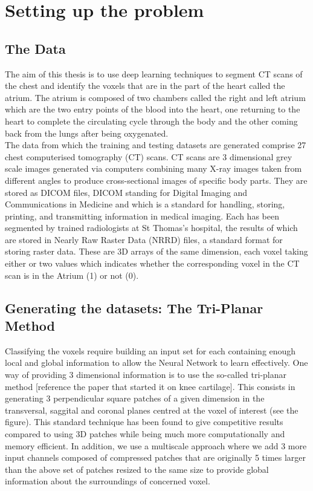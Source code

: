 \chapter{Setting up the problem}

\section{The Data}

The aim of this thesis is to use deep learning techniques to segment CT scans of the chest and identify the voxels that are in the part of the heart called the atrium. The atrium is composed of two chambers called the right and left atrium which are the two entry points of the blood into the heart, one returning to the heart to complete the circulating cycle through the body and the other coming back from the lungs after being oxygenated.\\

The data from which the training and testing datasets are generated comprise 27 chest computerised tomography (CT) scans. CT scans are 3 dimensional grey scale images generated via computers combining many X-ray images taken from different angles to produce cross-sectional images of specific body parts. They are stored as DICOM files, DICOM standing for Digital Imaging and Communications in Medicine and which is a standard for handling, storing, printing, and transmitting information in medical imaging. Each has been segmented by trained radiologists at St Thomas's hospital, the results of which are stored in Nearly Raw Raster Data (NRRD) files, a standard format for storing raster data. These are 3D arrays of the same dimension, each voxel taking either or two values which indicates whether the corresponding voxel in the CT scan is in the Atrium (1) or not (0). 

\section{Generating the datasets: The Tri-Planar Method}

Classifying the voxels require building an input set for each containing enough local and global information to allow the Neural Network to learn effectively. One way of providing 3 dimensional information is to use the so-called tri-planar method [reference the paper that started it on knee cartilage]. This consists in generating 3 perpendicular square patches of a given dimension in the transversal, saggital and coronal planes centred at the voxel of interest (see the figure). This standard technique has been found to give competitive results compared to using 3D patches while being much more computationally and memory efficient. In addition, we use a multiscale approach where we add 3 more input channels composed of compressed patches that are originally 5 times larger than the above set of patches resized to the same size to provide global information about the surroundings of concerned voxel.\\

